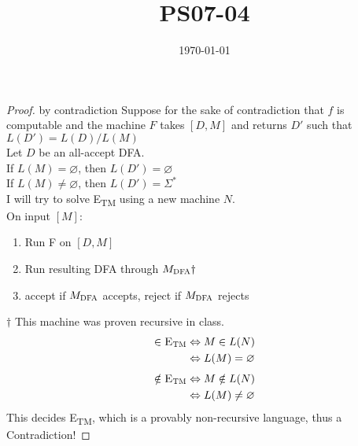\documentclass{article}
\title{PS07-04}
\date{\today}
\begin{document}
\maketitle
\begin{proof} by contradiction
Suppose for the sake of contradiction that $f$ is computable and the machine $F$ takes $[D, M]$ and returns $D'$ such that $L(D') = L(D)/L(M)$\\
Let $D$ be an all-accept DFA.\\
If $L(M) = \varnothing$, then $L(D') = \varnothing$\\
If $L(M) \neq \varnothing$, then $L(D') = \Sigma^*$\\
I will try to solve \textsc{E\textsubscript{TM}} using a new machine $N$. \\
On input $[M]$:
\begin{enumerate}
	\item Run F on $[D, M]$
	\item Run resulting DFA through $M_{\textsc{DFA}}\dagger$
	\item accept if $M_{\textsc{DFA}}$ accepts, reject if $M_{\textsc{DFA}}$ rejects
\end{enumerate}
$\dagger$ This machine was proven recursive in class.\\
\begin{align*}
[M] \in \textsc{E\textsubscript{TM}} &\Leftrightarrow M \in L(N)\\
&\Leftrightarrow L(M) = \varnothing
\end{align*}
\begin{align*}
[M] \notin \textsc{E\textsubscript{TM}} &\Leftrightarrow M \notin L(N)\\
&\Leftrightarrow L(M) \neq \varnothing
\end{align*}
This decides \textsc{E\textsubscript{TM}}, which is a provably non-recursive language, thus a Contradiction!
\end{proof}
\end{document}
